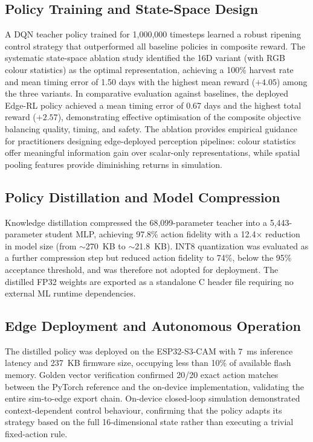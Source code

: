     \subsection{Policy Training and State-Space Design}

    A DQN teacher policy trained for 1,000,000 timesteps learned a robust ripening control strategy that outperformed all baseline policies in composite reward. The systematic state-space ablation study identified the 16D variant (with RGB colour statistics) as the optimal representation, achieving a 100\% harvest rate and mean timing error of 1.50 days with the highest mean reward ($+4.05$) among the three variants. In comparative evaluation against baselines, the deployed Edge-RL policy achieved a mean timing error of 0.67 days and the highest total reward ($+2.57$), demonstrating effective optimisation of the composite objective balancing quality, timing, and safety. The ablation provides empirical guidance for practitioners designing edge-deployed perception pipelines: colour statistics offer meaningful information gain over scalar-only representations, while spatial pooling features provide diminishing returns in simulation.

    \subsection{Policy Distillation and Model Compression}

    Knowledge distillation compressed the 68,099-parameter teacher into a 5,443-parameter student MLP, achieving 97.8\% action fidelity with a 12.4$\times$ reduction in model size (from $\sim$270~KB to $\sim$21.8~KB). INT8 quantization was evaluated as a further compression step but reduced action fidelity to 74\%, below the 95\% acceptance threshold, and was therefore not adopted for deployment. The distilled FP32 weights are exported as a standalone C header file requiring no external ML runtime dependencies.

    \subsection{Edge Deployment and Autonomous Operation}

    The distilled policy was deployed on the ESP32-S3-CAM with 7~ms inference latency and 237~KB firmware size, occupying less than 10\% of available flash memory. Golden vector verification confirmed 20/20 exact action matches between the PyTorch reference and the on-device implementation, validating the entire sim-to-edge export chain. On-device closed-loop simulation demonstrated context-dependent control behaviour, confirming that the policy adapts its strategy based on the full 16-dimensional state rather than executing a trivial fixed-action rule.

